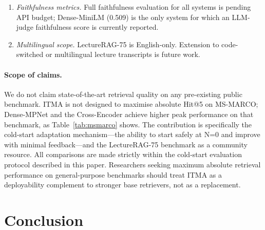 \documentclass[preprint,12pt]{elsarticle}
\begin{document}
\begin{enumerate}
        and 89 test items.  Performance on a larger, multi-instructor corpus
        with hundreds of chunks may differ; scaling evaluation is identified as
        priority future work.
  \item \emph{Faithfulness metrics.}  Full faithfulness evaluation for all
        systems is pending API budget; Dense-MiniLM (0.509) is the only
        system for which an LLM-judge faithfulness score is currently reported.
  \item \emph{Multilingual scope.}  LectureRAG-75 is English-only.  Extension
        to code-switched or multilingual lecture transcripts is future work.
\end{enumerate}

\paragraph{Scope of claims.}
We do not claim state-of-the-art retrieval quality on any pre-existing
public benchmark.  ITMA is not designed to maximise absolute Hit@5 on
MS-MARCO; Dense-MPNet and the Cross-Encoder achieve higher peak performance
on that benchmark, as Table~\ref{tab:msmarco} shows.  The contribution is
specifically the cold-start adaptation mechanism---the ability to start safely
at N=0 and improve with minimal feedback---and the LectureRAG-75
benchmark as a community resource.  All comparisons are made strictly within
the cold-start evaluation protocol described in this paper.  Researchers
seeking maximum absolute retrieval performance on general-purpose benchmarks
should treat ITMA as a deployability complement to stronger base retrievers,
not as a replacement.

\section{Conclusion}
\label{sec:conclusion}
\end{document}

